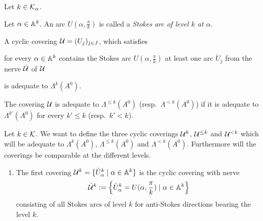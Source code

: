 \begin{prop}\label{prop:adeqCovCondition}
  Let $k\in\mathcal{K}_\alpha$.
  \begin{s-defn}
    Let $\alpha\in\mathbb{A}^k$.
    An arc $U(\alpha,\frac{\pi}{k})$ is called a \emph{Stokes arc of level $k$
    at $\alpha$}.
  \end{s-defn}
  A cyclic covering $\mathcal{U}=(U_j)_{j\in J}$, which satisfies
  \begin{einr}
    for every $\alpha\in\mathbb{A}^k$ contains the Stokes arc $U(\alpha,\frac{\pi}{k})$
    at least one arc $\dot U_j$ from the nerve $\dot{\mathcal{U}}$ of $\mathcal{U}$
  \end{einr}
  is adequate to $\Lambda^k(A^0)$.

  The covering $\mathcal{U}$ is adequate to $\Lambda^{\leq k}(A^0)$ (resp.\
  $\Lambda^{<k}(A^0)$) if it is adequate to $\Lambda^{k'}(A^0)$ for every
  $k'\leq k$ (resp.\ $k'<k$).
\end{prop}

Let $k\in\mathcal{K}$.
We want to define the three cyclic coverings $\mathcal{U}^{k}$, $\mathcal{U}^{\leq k}$ and
$\mathcal{U}^{<k}$ which will be adequate to $\Lambda^k(A^0)$, $\Lambda^{\leq k}(A^0)$
and $\Lambda^{<k}(A^0)$. Furthermore will the coverings be comparable at the
different levels.

\begin{enumerate}
  \item The first covering $\mathcal{U}^{k}=\{\dot U_\alpha^k\mid\alpha\in\mathbb{A}^k\}$
    is the cyclic covering with nerve
    \[
      \dot{\mathcal{U}}^k:=
      \left\{\dot U_\alpha^k=U(\alpha,\frac{\pi}{k})\mid\alpha\in\mathbb{A}^k\right\}
    \]
    consisting of all Stokes arcs of level $k$ for anti-Stokes directions
    bearing the level $k$.
\end{enumerate}

